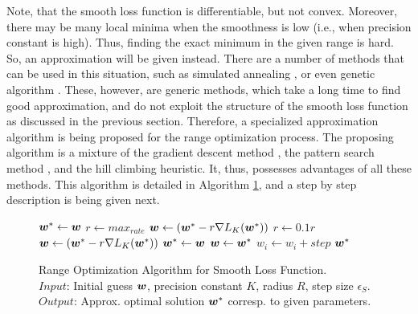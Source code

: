 Note, that the smooth loss function is differentiable, but not convex. Moreover, there may be many local minima when the smoothness is low (i.e., when precision constant is high). Thus, finding the exact minimum in the given range is hard. So, an approximation will be given instead. There are a number of methods that can be used in this situation, such as simulated annealing \cite{Kirkpatrick}, or even genetic algorithm \cite{Goldberg}. These, however, are generic methods, which take a long time to find good approximation, and do not exploit the structure of the smooth loss function as discussed in the previous section. Therefore, a specialized approximation algorithm is being proposed for the range optimization process. The proposing algorithm is a mixture of the gradient descent method \cite{Cauchy}, the pattern search method \cite{Hooke}, and the hill climbing heuristic. It, thus, possesses advantages of all these methods. This algorithm is detailed in Algorithm \ref{alg:sla.range}, and a step by step description is being given next. 

\begin{figure}
\caption{
Range Optimization Algorithm for Smooth Loss Function. \\
\text{\hspace{2.1cm}} $Input$: Initial guess $\boldsymbol{w}$, precision constant $K$, radius $R$, step size $\epsilon_S$. \\
\text{\hspace{2.1cm}} $Output$: Approx. optimal solution $\boldsymbol{w}^*$ corresp. to given parameters.
}
\label{alg:sla.range}
\begin{algorithmic}[1]
 
\Repeat
   \Statex {}
   \State $\boldsymbol{w}^* \gets \boldsymbol{w}$
   \Repeat
      \State $r \gets max_{rate}$
      \State $\boldsymbol{w} \gets (\boldsymbol{w}^* - r \nabla L_K(\boldsymbol{w}^*))$
         \State $r \gets 0.1 r$
         \State $\boldsymbol{w} \gets (\boldsymbol{w}^* - r\nabla L_K(\boldsymbol{w}^*))$
      \EndWhile
         \State $\boldsymbol{w}^* \gets \boldsymbol{w}$
      \EndIf
   \Statex {}
         \State $\boldsymbol{w} \gets \boldsymbol{w}^*$  
         \State $w_i \gets w_i + step$
         \EndIf       
      \EndFor
   \EndFor
   \Statex
{}
\State \Return $\boldsymbol{w}^*$
\EndFunction
\end{algorithmic}
\end{figure}

